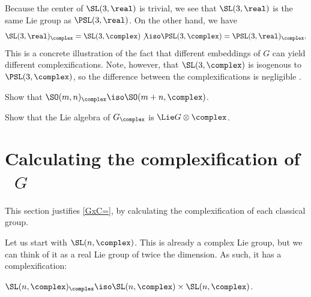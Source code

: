 \begin{eg} \label{GCnotWellDefd}
 Because the center of $\SL(3,\real)$ is trivial, we see
that $\SL(3,\real)$ is the same Lie group as $\PSL(3,\real)$.
On the other hand, we have
 $$ \SL(3,\real)_{\complex} = \SL(3,\complex) \not\iso
\PSL(3,\complex) = \PSL(3,\real)_{\complex} .$$
 This is a concrete illustration of the fact that different
embeddings of $G$ can yield different complexifications.
Note, however, that $\SL(3,\complex)$ is isogenous to
$\PSL(3,\complex)$, so the difference between the
complexifications is negligible
.
 \end{eg}
 

\begin{exercises}

\item \label{SOpqxC}
 Show that $\SO(m,n)_{\complex} \iso
\SO(m+n,\complex)$. 

\item \label{Lie(GxC)}
 Show that the Lie algebra of $G_{\complex}$ is $\Lie G \otimes \complex$.

\end{exercises}







\section{Calculating the complexification of%
	\texorpdfstring{~$G$}{ G}}
\label{CalcGxCSect}

This section justifies \cref{GxC=}, by calculating the complexification of each classical group.

Let us start with $\SL(n,\complex)$. This is already a complex Lie group, but
we can think of it as a real Lie group of twice the
dimension. As such, it has a complexification:

\begin{prop} \label{SLnCxC}
 $\SL(n,\complex)_{\complex} \iso \SL(n,\complex)
\times \SL(n,\complex)$.
 \end{prop}

